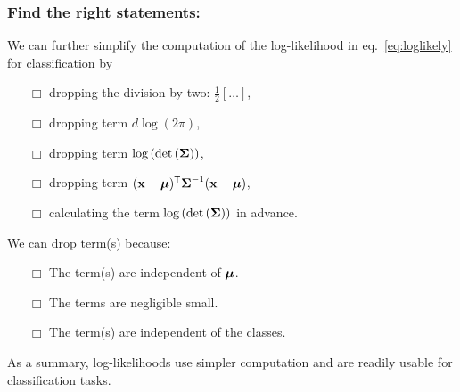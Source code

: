 \documentclass[a4paper]{article}
\newcommand{\trn}{^{\mathsf T}} %
\newcommand{\xv}{\ensuremath\mathbf{x}}  %
\newcommand{\muv}{\ensuremath\boldsymbol{\mu}}  %
\newcommand{\Sm}{\ensuremath\boldsymbol{\Sigma}}  %
\begin{document}
\subsubsection*{Find the right statements:}
We can further simplify the computation of the log-likelihood in
eq.~\ref{eq:loglikely} for classification by
\begin{itemize}
\item[$\Box$] dropping the division by two: $\frac{1}{2}
  \left[\ldots\right]$,
\item[$\Box$] dropping term $d\log \left( 2\pi \right)$,
\item[$\Box$] dropping term $\log \left( \det\left(\Sm\right)
  \right)$,
\item[$\Box$] dropping term $(\xv-\muv)\trn \Sm^{-1} (\xv-\muv)$,
\item[$\Box$] calculating the term $\log \left( \det\left(\Sm\right)
  \right)$ in advance.
\end{itemize}

\medskip
\noindent
We can drop term(s) because:
\begin{itemize}
\item[$\Box$] The term(s) are independent of $\muv$.
\item[$\Box$] The terms are negligible small.
\item[$\Box$] The term(s) are independent of the classes.
\end{itemize}

\noindent As a summary, log-likelihoods use simpler computation and are readily
usable for classification tasks.
\end{document}
